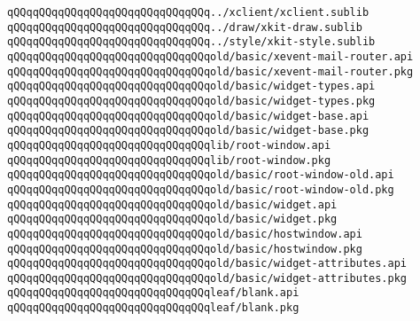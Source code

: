 \newline
\verb|qQQqqQQqqQQqqQQqqQQqqQQqqQQqqQQq../xclient/xclient.sublib|\newline
\verb|qQQqqQQqqQQqqQQqqQQqqQQqqQQqqQQq../draw/xkit-draw.sublib|\newline
\verb|qQQqqQQqqQQqqQQqqQQqqQQqqQQqqQQq../style/xkit-style.sublib|\newline
\newline
\verb|qQQqqQQqqQQqqQQqqQQqqQQqqQQqqQQqold/basic/xevent-mail-router.api|\newline
\verb|qQQqqQQqqQQqqQQqqQQqqQQqqQQqqQQqold/basic/xevent-mail-router.pkg|\newline
\verb|qQQqqQQqqQQqqQQqqQQqqQQqqQQqqQQqold/basic/widget-types.api|\newline
\verb|qQQqqQQqqQQqqQQqqQQqqQQqqQQqqQQqold/basic/widget-types.pkg|\newline
\verb|qQQqqQQqqQQqqQQqqQQqqQQqqQQqqQQqold/basic/widget-base.api|\newline
\verb|qQQqqQQqqQQqqQQqqQQqqQQqqQQqqQQqold/basic/widget-base.pkg|\newline
\newline
\verb|qQQqqQQqqQQqqQQqqQQqqQQqqQQqqQQqlib/root-window.api|\newline
\verb|qQQqqQQqqQQqqQQqqQQqqQQqqQQqqQQqlib/root-window.pkg|\newline
\newline
\verb|qQQqqQQqqQQqqQQqqQQqqQQqqQQqqQQqold/basic/root-window-old.api|\newline
\verb|qQQqqQQqqQQqqQQqqQQqqQQqqQQqqQQqold/basic/root-window-old.pkg|\newline
\newline
\verb|qQQqqQQqqQQqqQQqqQQqqQQqqQQqqQQqold/basic/widget.api|\newline
\verb|qQQqqQQqqQQqqQQqqQQqqQQqqQQqqQQqold/basic/widget.pkg|\newline
\verb|qQQqqQQqqQQqqQQqqQQqqQQqqQQqqQQqold/basic/hostwindow.api|\newline
\verb|qQQqqQQqqQQqqQQqqQQqqQQqqQQqqQQqold/basic/hostwindow.pkg|\newline
\verb|qQQqqQQqqQQqqQQqqQQqqQQqqQQqqQQqold/basic/widget-attributes.api|\newline
\verb|qQQqqQQqqQQqqQQqqQQqqQQqqQQqqQQqold/basic/widget-attributes.pkg|\newline
\newline
\verb|qQQqqQQqqQQqqQQqqQQqqQQqqQQqqQQqleaf/blank.api|\newline
\verb|qQQqqQQqqQQqqQQqqQQqqQQqqQQqqQQqleaf/blank.pkg|\newline
